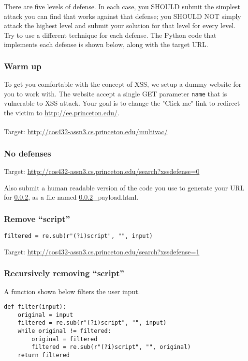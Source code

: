 \documentclass[letterpaper,12pt]{report}
\newcommand{\bungledomain}{http://cos432-assn3.cs.princeton.edu}
\begin{document}
There are five levels of defense.  In each case, you SHOULD submit the simplest attack you can find that works against that defense; you SHOULD NOT simply attack the highest level and submit your solution for that level for every level. Try to use a different technique for each defense.  The Python code that implements each defense is shown below, along with the target URL.

\subsubsection{Warm up}
\label{sec:xss_warm_up}
To get you comfortable with the concept of XSS, we setup a dummy website for you to work with.  The website accept a single GET parameter \texttt{name} that is vulnerable to XSS attack.  Your goal is to change the "Click me" link to redirect the victim to \url{http://ee.princeton.edu/}.\\\\
Target: \url{\bungledomain/multivac/}

\subsubsection{No defenses}
\label{sec:xss_1}
Target: \url{\bungledomain/search?xssdefense=0}\\
\smallskip

Also submit a human readable version of the code you use to generate your URL for \ref{sec:xss_1}, as a file named \ref{sec:xss_1}\_payload.html.

\subsubsection{\textbf{Remove ``script''}}
\label{sec:xss_2}
\verb+filtered = re.sub(r"(?i)script", "", input)+
\smallskip

Target: \url{\bungledomain/search?xssdefense=1}\\

\subsubsection{\textbf{Recursively removing ``script''}}
\label{sec:xss_3}
A function shown below filters the user input.

\begin{mdframed}
\begin{Verbatim}
def filter(input):
    original = input
    filtered = re.sub(r"(?i)script", "", input)
    while original != filtered:
        original = filtered
        filtered = re.sub(r"(?i)script", "", original)
    return filtered
\end{Verbatim}
\end{mdframed}
\smallskip
\end{document}
